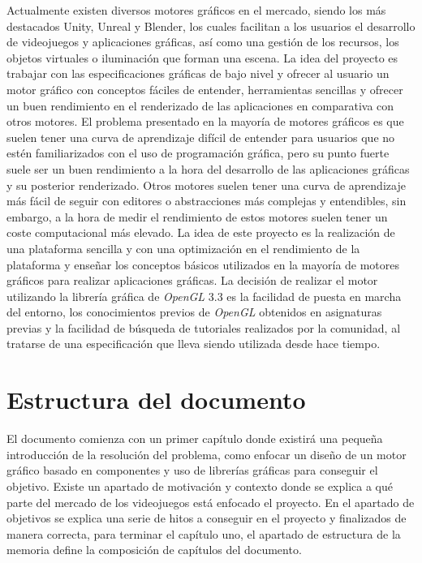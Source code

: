 \documentclass[a4paper]{book}
\begin{document}
Actualmente existen diversos motores gráficos en el mercado, siendo los más destacados Unity, Unreal y Blender,
los cuales facilitan a los usuarios el desarrollo de videojuegos y aplicaciones gráficas, así como una gestión
de los recursos, los objetos virtuales o iluminación que forman una escena. La idea del proyecto es trabajar con las 
especificaciones gráficas de bajo nivel y ofrecer al usuario un motor gráfico con conceptos fáciles de entender, herramientas
sencillas y ofrecer un buen rendimiento en el renderizado de las aplicaciones en comparativa con otros motores.
El problema presentado en la mayoría de motores gráficos es que suelen tener una curva de aprendizaje difícil
de entender para usuarios que no estén familiarizados con el uso de programación gráfica, pero su punto fuerte
suele ser un buen rendimiento a la hora del desarrollo de las aplicaciones gráficas y su posterior renderizado.
Otros motores suelen tener una curva de aprendizaje más fácil de seguir con editores o abstracciones más complejas y entendibles,
sin embargo, a la hora de medir el rendimiento de estos motores suelen tener un coste computacional más elevado.
La idea de este proyecto es la realización de una plataforma sencilla y con una optimización en el rendimiento de la
plataforma y enseñar los conceptos básicos utilizados en la mayoría de motores gráficos para realizar aplicaciones gráficas.
La decisión de realizar el motor utilizando la librería gráfica de \textit{OpenGL} 3.3 es la facilidad de puesta en marcha del
entorno, los conocimientos previos de \textit{OpenGL} obtenidos en asignaturas previas y la facilidad de búsqueda de tutoriales
realizados por la comunidad, al tratarse de una especificación que lleva siendo utilizada desde hace tiempo.

\section{Estructura del documento}
\label{sec:estructura}

El documento comienza con un primer capítulo donde existirá una pequeña introducción de la resolución
del problema, como enfocar un diseño de un motor gráfico basado en componentes y uso de librerías gráficas
para conseguir el objetivo. Existe un apartado de motivación y contexto donde se explica a qué parte del
mercado de los videojuegos está enfocado el proyecto. En el apartado de objetivos se explica una serie de
hitos a conseguir en el proyecto y finalizados de manera correcta, para terminar el capítulo uno, el
apartado de estructura de la memoria define la composición de capítulos del documento.
\end{document}
